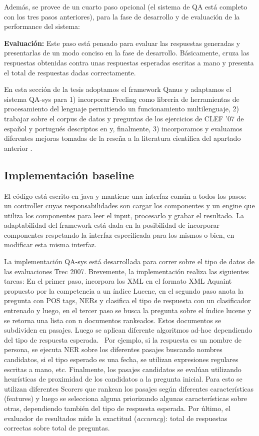 Además, se provee de un cuarto paso opcional (el sistema de QA está
completo con los tres pasos anteriores), para la fase de desarrollo y
de evaluación de la performance del sistema:\newline


\textbf{Evaluación: }Este paso está pensado para evaluar las respuestas generadas y
presentarlas de un modo conciso en la fase de desarrollo.
Básicamente, cruza las respuestas obtenidas contra unas respuestas
esperadas escritas a mano y presenta el total de respuestas dadas
correctamente.\newline

En esta sección de la tesis adoptamos el framework Qanus y adaptamos el sistema QA-sys para 1) incorporar Freeling como librería de herramientas de procesamiento del lenguaje permitiendo un funcionamiento multilenguaje, 2) trabajar sobre el corpus de datos y preguntas de los ejercicios de CLEF '07 de español y portugués descriptos en  y, finalmente, 3) incorporamos y evaluamos diferentes mejoras tomadas de la reseña a la literatura científica del apartado anterior .

\subsection{Implementación baseline}

El código está escrito en java y mantiene una interfaz común a
todos los pasos: un controller cuyas responsabilidades son cargar los
componentes y un engine que utiliza los componentes para leer el input,
procesarlo y grabar el resultado. La adaptabilidad del framework está
dada en la posibilidad de incorporar componentes respetando la interfaz
especificada para los mismos o bien, en modificar esta misma interfaz.

La implementación QA-sys está desarrollada para correr sobre
el tipo de datos de las evaluaciones Trec 2007. 
Brevemente, la implementación realiza las siguientes tareas:
En el primer paso, incorpora los XML en el formato XML Aquaint propuesto por la competencia a un índice Lucene, en
el segundo paso anota la pregunta con POS tags, NERs y
clasifica el tipo de respuesta con un clasificador entrenado y luego,
en el tercer paso se busca la pregunta sobre el índice lucene y se
retorna una lista con n documentos rankeados. Estos documentos se
subdividen en pasajes. Luego se aplican diferente algoritmos ad-hoc
dependiendo del tipo de respuesta esperada. \ Por ejemplo, si la
respuesta es un nombre de persona, se ejecuta NER sobre los diferentes
pasajes buscando nombres candidatos, si el tipo esperado es una fecha,
se utilizan expresiones regulares escritas a mano, etc. Finalmente, los
pasajes candidatos se evalúan utilizando heurísticas de proximidad
de los candidatos a la pregunta inicial. Para esto se utilizan
diferentes Scorers que rankean los pasajes según diferentes
características (features) y luego se selecciona alguna priorizando
algunas características sobre otras, dependiendo también del tipo
de respuesta esperada. Por último, el evaluador de resultados mide la
exactitud (\textit{accuracy}): total de respuestas correctas sobre
total de preguntas. 


